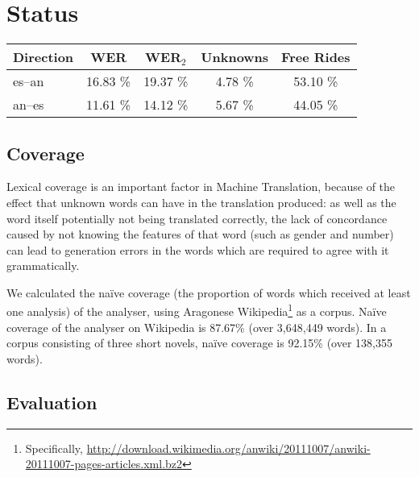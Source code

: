 \documentclass[10pt,a4paper,twocolumn]{article}
\begin{document}
  \section{Status}
  
  \begin{table*}
  \centering
  \begin{tabular}{|l|c|c|c|c|}
  \hline
  Direction    & WER & WER$_2$ & Unknowns & Free Rides\\
  \hline
  es--an        & 16.83 \% & 19.37 \%  & 4.78 \% & 53.10 \% \\
  an--es        & 11.61 \% & 14.12 \%  & 5.67 \% & 44.05 \% \\
  \hline
  \end{tabular}
    \caption{Evaluation results for both directions. Free rides are those unknown words which
       are identical in both the source and target language. Although they do not cause
       a degradation in translation quality, it is relevant to take them into account when
       evaluating the system. Unknown words are included as an indication of naïve coverage
       over the test sets.
       For brevity, we refer to the languages by their ISO 639-1 codes: {\tt es} for Spanish, and {\tt an} for Aragonese.}
    \label{table:quanteval}
  \end{table*}
  
  \subsection{Coverage}
  
  Lexical coverage is an important factor in Machine Translation, because of the effect that unknown words can have in the translation produced: as well as the word itself potentially not being translated correctly, the lack of concordance caused by not knowing the features of that word (such as gender and number) can lead to generation errors in the words which are required to agree with it grammatically.
  
We calculated the naïve coverage (the proportion of words which received at least one analysis) of the analyser, using Aragonese Wikipedia\footnote{Specifically, \url{http://download.wikimedia.org/anwiki/20111007/anwiki-20111007-pages-articles.xml.bz2}} as a corpus. Naïve coverage of the analyser on Wikipedia is 87.67\% (over 3,648,449 words).  In a corpus consisting of three short novels, naïve coverage is 92.15\% (over 138,355 words).
  
  \subsection{Evaluation}
  
\end{document}
